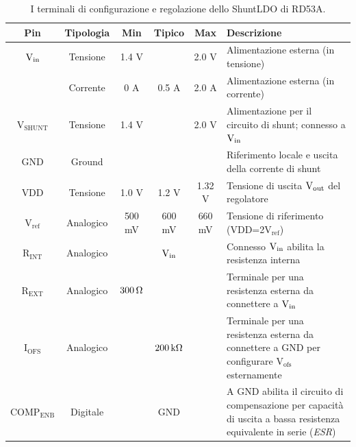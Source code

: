 \begin{table}
\begin{small}
\noindent\setlength\tabcolsep{4pt}%
\begin{tabularx}{\linewidth}{c|c|c|c|c|X}
\textbf{Pin} & \textbf{Tipologia} & \textbf{Min} & \textbf{Tipico} & \textbf{Max} & \textbf{Descrizione} \\ \hline
$\mathrm{V_{in}}$ & Tensione & 1.4 V & & 2.0 V & Alimentazione esterna (in tensione)\\
 & Corrente & 0 A & 0.5 A & 2.0 A & Alimentazione esterna (in corrente)\\ \hline 
$\mathrm{V_{SHUNT}}$ & Tensione & 1.4 V & & 2.0 V & Alimentazione per il circuito di shunt; connesso a $\mathrm{\mathrm{V_{in}}}$\\ \hline%
GND & Ground &  & &  & Riferimento locale e uscita della corrente di shunt\\ \hline
VDD & Tensione & 1.0 V & 1.2 V & 1.32 V & Tensione di uscita $\mathrm{V_{out}}$ del regolatore\\ \hline
$\mathrm{V_{ref}}$ & Analogico & 500 mV & 600 mV & 660 mV & Tensione di riferimento (VDD=2$\mathrm{V_{ref}}$)\\ \hline
$\mathrm{R_{INT}}$ & Analogico &  & $\mathrm{\mathrm{V_{in}}}$ &  & Connesso $\mathrm{\mathrm{V_{in}}}$ abilita la resistenza interna\\ \hline
$\mathrm{R_{EXT}}$ & Analogico & $300{\rm \, \Omega}$ &  &  & Terminale per una resistenza esterna da connettere a $\mathrm{\mathrm{V_{in}}}$\\ \hline
$\mathrm{I_{OFS}}$ & Analogico &  & $200{\rm \, k\Omega}$ &  & Terminale per una resistenza esterna da connettere a GND per configurare $\mathrm{V_{ofs}}$ esternamente\\ \hline
$\mathrm{COMP_{ENB}}$ & Digitale &  & GND &  & A GND abilita il circuito di compensazione per capacità di uscita a bassa resistenza equivalente in serie ({\em ESR})\\
\end{tabularx}
\end{small}
\caption{I terminali di configurazione e regolazione dello ShuntLDO di RD53A.}
\label{tab:sldord53a}
\end{table}

